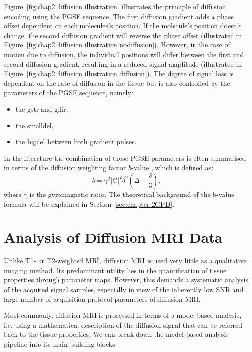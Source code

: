 Figure~\ref{fig:chap2 diffusion illustration} illustrates the principle of diffusion encoding using the PGSE sequence. The first diffusion gradient adds a phase offset dependent on each molecules's position. If the molecule's position doesn't change, the second diffusion gradient will reverse the phase offset (illustrated in Figure~\ref{fig:chap2 diffusion illustration nodiffusion}). However, in the case of motion due to diffusion, the individual positions will differ between the first and second diffusion gradient, resulting in a reduced signal amplitude	(illustrated in Figure~\ref{fig:chap2 diffusion illustration diffusion}). The degree of signal loss is dependent on the rate of diffusion in the tissue but is also controlled by the parameters of the {\gls{PGSE}} sequence, namely:

\begin{itemize}
	\item the {\gls{gstr}} and {\gls{gdir}},
	\item the {\gls{smalldel}},
	\item the {\gls{bigdel}} between both gradient pulses.
\end{itemize}

In the literature the combination of those PGSE parameters is often summarised in terms of the diffusion weighting factor $b$-value \citep{LeBihan:1986}, which is defined as:
\begin{equation}
	b = \gamma^2|G|^2\delta^2(\Delta-\frac{\delta}{3}),
    \label{eq:bvalue}
\end{equation}
where $\gamma$ is the gyromagnetic ratio. The theoretical background of the b-value formula will be explained in Section~\ref{sec:chapter 2GPD}.

\section{Analysis of Diffusion MRI Data}
Unlike T1- or T2-weighted MRI, diffusion MRI is used very little as a qualitative imaging method. Its predominant utility lies in the quantification of tissue properties through parameter maps. However, this demands a systematic analysis of the acquired signal samples, especially in view of the inherently low SNR and large number of acquisition protocol parameters of diffusion MRI.


Most commonly, diffusion MRI is processed in terms of a model-based analysis, i.e. using a mathematical description of the diffusion signal that can be referred back to the tissue properties. We can break down the model-based analysis pipeline into its main building blocks: 
